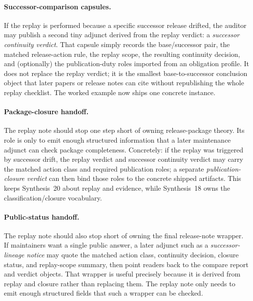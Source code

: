 \documentclass[11pt]{article}
\begin{document}
\paragraph{Successor-comparison capsules.}
If the replay is performed because a specific successor release drifted, the auditor may publish a second tiny adjunct derived from the replay verdict: a \emph{successor continuity verdict}. That capsule simply records the base/successor pair, the matched release-action rule, the replay scope, the resulting continuity decision, and (optionally) the publication-duty roles imported from an obligation profile. It does not replace the replay verdict; it is the smallest base-to-successor conclusion object that later papers or release notes can cite without republishing the whole replay checklist. The worked example now ships one concrete instance.\cite{series:workedexample,series:planstateequiv}

\paragraph{Package-closure handoff.}
The replay note should stop one step short of owning release-package theory. Its role is only to emit enough structured information that a later maintenance adjunct can check package completeness. Concretely: if the replay was triggered by successor drift, the replay verdict and successor continuity verdict may carry the matched action class and required publication roles; a separate \emph{publication-closure verdict} can then bind those roles to the concrete shipped artifacts. This keeps Synthesis~20 about replay and evidence, while Synthesis~18 owns the classification/closure vocabulary.\cite{series:workedexample,series:planstateequiv}

\paragraph{Public-status handoff.}
The replay note should also stop short of owning the final release-note wrapper. If maintainers want a single public answer, a later adjunct such as a \emph{successor-lineage notice} may quote the matched action class, continuity decision, closure status, and replay-scope summary, then point readers back to the compare report and verdict objects. That wrapper is useful precisely because it is derived from replay and closure rather than replacing them. The replay note only needs to emit enough structured fields that such a wrapper can be checked.\cite{series:workedexample,series:planstateequiv}
\end{document}

